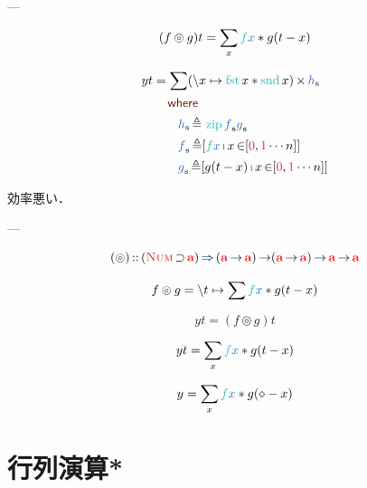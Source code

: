 \documentclass[a5paper,twoside,fleqn,draft]{jsbook}
\begin{document}

---

\begin{equation}
(f\circledcirc g)t=\sum_x\hFunc{f}\hVar{x}*g(t-x)
\end{equation}

\begin{equation}
\begin{aligned}
yt&=\sum(\hLambdaSyntax{x}{\mFst x*\mSnd x})\hMap\hListVar{h}\\
&\quad\mWhere\\
&\qquad\hListVar{h}\mLetEq{}\mZipFunc\hListVar{f}\hListVar{g}\\
&\qquad\hListVar{f}\mLetEq[\hFunc{f}\hVar{x}\mListComp x\mFrom[\hConstant{0},\hConstant{1}\dotsb n]]\\
&\qquad\hListVar{g}\mLetEq[g(t-x)\mListComp x\mFrom[\hConstant{0},\hConstant{1}\dotsb n]]
\end{aligned}
\end{equation}

効率悪い．

---

\begin{equation}
(\circledcirc)\hIsTypeOf{}(\hNum\hHasElementsOf\hTypeName{a} )\hAndThen{}
\mProjEXP{
  (\mProjEXP{\hTypeName{a} }{\hTypeName{a} })
}
{
  \mProjEXP{(\mProjEXP{\hTypeName{a} }{\hTypeName{a} })}
  {\mProjEXP{\hTypeName{a} }{\hTypeName{a} }}
}
\end{equation}

\begin{equation}
f\circledcirc g=\hLambdaSyntax{t}{\sum \hFunc{f}\hVar{x}*g(t-x)}
\end{equation}


$$
yt=(f\circledcirc g)t
$$


$$
yt=\sum_x\hFunc{f}\hVar{x}*g(t-x)
$$

$$
y=\sum_x\hFunc{f}\hVar{x}*g(\hAnonParam-x)
$$

\section{行列演算*}


\end{document}
